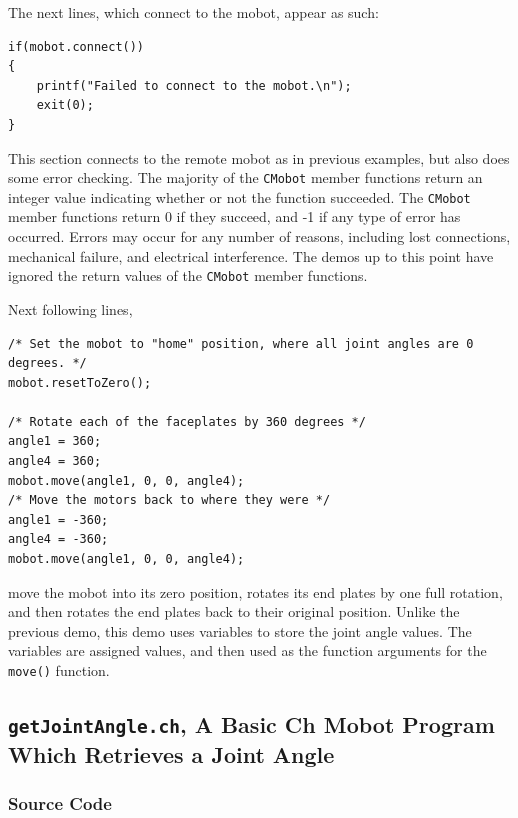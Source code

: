 \documentclass{article}
\begin{document}
The next
lines, which connect to the mobot, appear as such:
\begin{verbatim}
if(mobot.connect())
{
    printf("Failed to connect to the mobot.\n");
    exit(0);
}
\end{verbatim}
This section connects to the remote mobot as in previous examples, but also
does some error checking. The majority of the \texttt{CMobot} member functions
return an integer value indicating whether or not the function succeeded.
The \texttt{CMobot} member functions return 0 if they succeed, and -1
if any type of error has occurred. Errors may occur for any number of reasons,
including lost connections, mechanical failure, and electrical interference. 
The demos up to this point have ignored the return values of the 
\texttt{CMobot} member functions.

Next following lines,
\begin{verbatim}
/* Set the mobot to "home" position, where all joint angles are 0 degrees. */
mobot.resetToZero();

/* Rotate each of the faceplates by 360 degrees */
angle1 = 360;
angle4 = 360;
mobot.move(angle1, 0, 0, angle4);
/* Move the motors back to where they were */
angle1 = -360;
angle4 = -360;
mobot.move(angle1, 0, 0, angle4);
\end{verbatim}
move the mobot into its zero position, rotates its end plates by one full rotation, and then
rotates the end plates back to their original position. Unlike the previous demo, this 
demo uses variables to store the joint angle values. The variables are assigned 
values, and then used as the function arguments for the \texttt{move()} function.

\subsection{\texttt{getJointAngle.ch}, A Basic Ch Mobot Program Which Retrieves a Joint Angle}
\subsubsection{Source Code}

\end{document}

